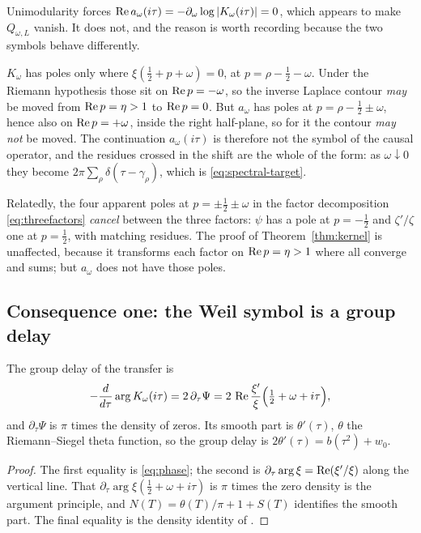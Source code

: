\begin{remark}\label{rem:trap}
Unimodularity forces
$\operatorname{Re} a_\omega(i\tau)=-\partial_\omega\log|K_\omega(i\tau)|=0$, which appears to
make $Q_{\omega,L}$ vanish. It does not, and the reason is worth recording
because the two symbols behave differently.

$K_\omega$ has poles only where $\xi(\frac12+p+\omega)=0$, at
$p=\rho-\frac12-\omega$. Under the Riemann hypothesis those sit on
$\operatorname{Re} p=-\omega$, so the inverse Laplace contour \emph{may} be moved from
$\operatorname{Re} p=\eta>1$ to $\operatorname{Re} p=0$. But $a_\omega$ has poles at
$p=\rho-\frac12\pm\omega$, hence also on $\operatorname{Re} p=+\omega$, inside the right
half-plane, so for it the contour \emph{may not} be moved. The continuation
$a_\omega(i\tau)$ is therefore not the symbol of the causal operator, and the
residues crossed in the shift are the whole of the form: as $\omega\downarrow0$
they become $2\pi\sum_\rho\delta(\tau-\gamma_\rho)$, which is
\eqref{eq:spectral-target}.

Relatedly, the four apparent poles at $p=\pm\frac12\pm\omega$ in the factor
decomposition \eqref{eq:threefactors} \emph{cancel} between the three factors:
$\psi$ has a pole at $p=-\frac12$ and $\zeta'/\zeta$ one at $p=\frac12$, with
matching residues. The proof of Theorem~\ref{thm:kernel} is unaffected, because
it transforms each factor on $\operatorname{Re} p=\eta>1$ where all converge and sums; but
$a_\omega$ does not have those poles.
\end{remark}

\subsection{Consequence one: the Weil symbol is a group delay}

\begin{proposition}\label{prop:groupdelay}
The group delay of the transfer is
\[
 -\frac{d}{d\tau}\arg K_\omega(i\tau)=2\,\partial_\tau\Psi
 =2\,\operatorname{Re}\frac{\xi'}{\xi}\Big(\tfrac12+\omega+i\tau\Big),
\]
and $\partial_\tau\Psi$ is $\pi$ times the density of zeros. Its smooth part is
$\theta'(\tau)$, $\theta$ the Riemann--Siegel theta function, so the group delay
is $2\theta'(\tau)=b(\tau^2)+w_0$.
\end{proposition}

\begin{proof}
The first equality is \eqref{eq:phase}; the second is
$\partial_\tau\arg\xi=\operatorname{Re}(\xi'/\xi)$ along the vertical line. That
$\partial_\tau\arg\xi(\frac12+\omega+i\tau)$ is $\pi$ times the zero density is
the argument principle, and $N(T)=\theta(T)/\pi+1+S(T)$ identifies the smooth
part. The final equality is the density identity of \cite{Selection}.
\end{proof}

